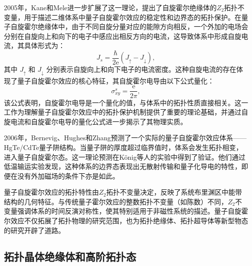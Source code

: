 2005年，Kane和Mele进一步扩展了这一理论\cite{e2,e3}，提出了自旋霍尔绝缘体的$Z_2$拓扑不变量，用于描述二维体系中量子自旋霍尔效应的稳定性和边界态的拓扑保护。在量子自旋霍尔绝缘体中，由于不同自旋分量对应的能隙方向相反，一个外加的电场会分别在自旋向上和向下的电子中感应出相反方向的电流，这导致体系中形成自旋电流，其具体形式为：
\begin{equation} \label{eq1-6}
    J_s = \frac{\hbar}{2\mathrm{e}}(J_\uparrow - J_\downarrow),
\end{equation}
其中 \(J_\uparrow\) 和 \(J_\downarrow\) 分别表示自旋向上和向下电子的电流密度。这种自旋电流的存在体现了量子自旋霍尔效应的核心特征，其自旋霍尔电导由以下公式量化：
\begin{equation} \label{eq1-7}
    \sigma_{xy}^s = \frac{\mathrm{e}}{2\pi},
\end{equation}
该公式表明，自旋霍尔电导是一个量化的值，与体系中的拓扑性质直接相关。这一工作为理解量子自旋霍尔效应中的拓扑保护机制提供了重要的理论基础，并通过自旋电流和自旋霍尔电导的量化公式进一步揭示了其物理实质。

2006年，Bernevig、Hughes和Zhang预测了一个实际的量子自旋霍尔效应体系——HgTe/CdTe量子阱结构\cite{e4}。当量子阱的厚度超过临界值时，体系会发生拓扑相变，进入量子自旋霍尔态。这一理论预测在König等人的实验中得到了验证\cite{e5}。他们通过低温输运实验发现，这种体系的边界态表现出无散射传输和量子化导电的特性，即便在没有外加磁场的条件下亦是如此。

量子自旋霍尔效应的拓扑特性由$Z_2$拓扑不变量决定，反映了系统布里渊区中能带结构的几何特征。与传统量子霍尔效应的整数拓扑不变量（如陈数）不同，$Z_2$不变量强调体系的时间反演对称性，使其特别适用于非磁性系统的描述。量子自旋霍尔效应不仅拓展了拓扑物理的研究范围，也为拓扑绝缘体、拓扑超导体等新型物态的研究开辟了道路。


\subsection{拓扑晶体绝缘体和高阶拓扑态}

